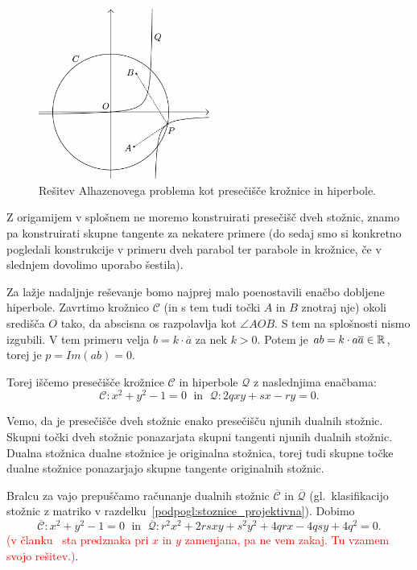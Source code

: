 \begin{figure}[h]
    \centering
    \includegraphics[width=0.5\textwidth]{images/alhazen/huygens2.png}
    \caption[Huygensova rešitev]{Rešitev Alhazenovega problema kot presečišče krožnice in hiperbole.}
    \label{fig:huygens2}
\end{figure}

Z origamijem v splošnem ne moremo konstruirati presečišč dveh stožnic, znamo pa konstruirati skupne tangente za nekatere primere (do sedaj smo si konkretno pogledali konstrukcije v primeru dveh parabol ter parabole in krožnice, če v slednjem dovolimo uporabo šestila).

Za lažje nadaljnje reševanje bomo najprej malo poenostavili enačbo dobljene hiperbole. Zavrtimo krožnico $\mathcal{C}$ (in s tem tudi točki $A$ in $B$ znotraj nje) okoli središča $O$ tako, da abscisna os razpolavlja kot $\angle AOB$. S tem na splošnosti nismo izgubili. V tem primeru velja $b = k \cdot \overline{a}$ za nek $k > 0$. Potem je $ab = k \cdot a \overline{a} \in \mathbb R$, torej je $p = Im(ab) = 0$.

Torej iščemo presečišče krožnice $\mathcal{C}$ in hiperbole $\mathcal{Q}$ z naslednjima enačbama:
$$ \mathcal{C}: x^2 + y^2 - 1 = 0 \; \text{ in } \; \mathcal{Q}: 2qxy + sx - ry = 0. $$

Vemo, da je presečišče dveh stožnic enako presečišču njunih dualnih stožnic. Skupni točki dveh stožnic ponazarjata skupni tangenti njunih dualnih stožnic. Dualna stožnica dualne stožnice je originalna stožnica, torej tudi skupne točke dualne stožnice ponazarjajo skupne tangente originalnih stožnic.

Bralcu za vajo prepuščamo računanje dualnih stožnic $\mathcal{\overline{C}}$ in $\mathcal{\overline{Q}}$ (gl.\ klasifikacijo stožnic z matriko v razdelku~\ref{podpogl:stoznice_projektivna}). Dobimo
$$ \mathcal{\overline{C}}: x^2 + y^2 - 1 = 0 \; \text{ in } \; \mathcal{\overline{Q}}: r^2x^2 + 2rsxy + s^2y^2 + 4qrx - 4qsy + 4q^2 = 0. $$
\textcolor{red}{(v članku~\cite{alperin2002} sta predznaka pri $x$ in $y$ zamenjana, pa ne vem zakaj. Tu vzamem svojo rešitev.)}.

